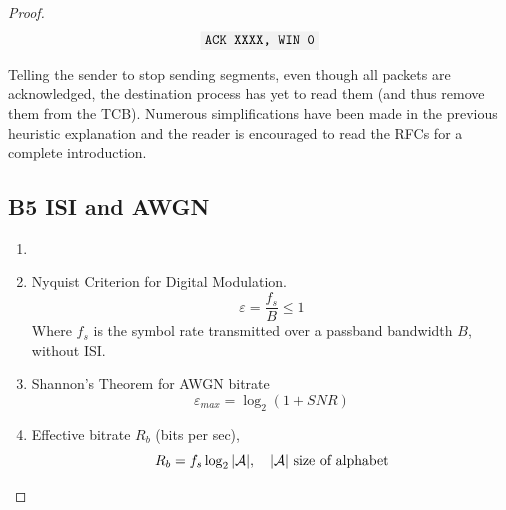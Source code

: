 \documentclass[../../main.tex]{subfiles}
\begin{document}
\begin{proof}
    \[\code{ACK XXXX, WIN 0}\]
    
    Telling the sender to stop sending segments, even though all packets are acknowledged, the destination process has yet to read them (and thus remove them from the TCB). Numerous simplifications have been made in the previous heuristic explanation and the reader is encouraged to read the RFCs for a complete introduction.

\newcommand{\pxf}{P_{\mathbf{X}}(f)}
\newcommand{\pyf}{P_{\mathbf{y}}(f)}
\newcommand{\hf}{\mathbf{H}(f)}
\newcommand{\xf}{\mathbf{X}(f)}
\newcommand{\yf}{\mathbf{Y}(f)}
\subsection*{B5 ISI and AWGN}
\begin{wtr}
\begin{enumerate}
    \item[]
    \item Nyquist Criterion for Digital Modulation.
    \[
    \varepsilon=\dfrac{f_s}{B}\leq 1
    \]
    Where $f_s$ is the symbol rate transmitted over a passband bandwidth $B$, without ISI.
    \item Shannon's Theorem for AWGN bitrate
    \[
    \varepsilon_{max} = \log_2(1+SNR)
    \]
    \item Effective bitrate $R_b$ (bits per sec),
    \[
    R_b = f_s\log_2|\cal{A}|,\quad |\cal{A}| \text{ size of alphabet}
    \]
\end{enumerate}
    
\end{wtr}
\end{proof}
\end{document}
